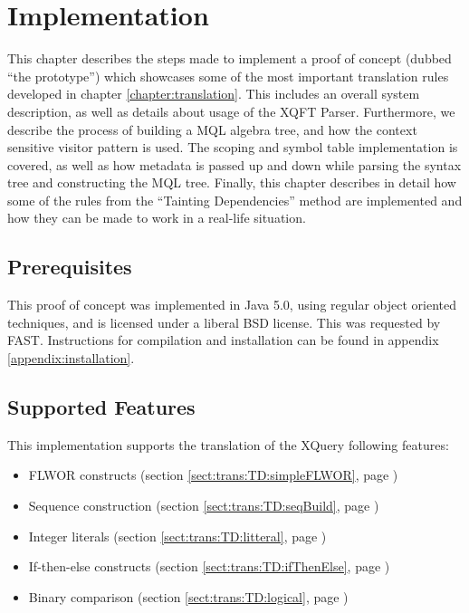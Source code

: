 \chapter{Implementation}
\label{chapter:implementation}
This chapter describes the steps made to implement a proof of concept (dubbed
``the prototype'') which showcases some of the most important translation rules
developed in chapter \ref{chapter:translation}. This includes an overall system
description, as well as details about usage of the XQFT Parser. Furthermore, we
describe the process of building a MQL algebra tree, and how the context
sensitive visitor pattern is used. The scoping and symbol table implementation
is covered, as well as how metadata is passed up and down while parsing the
syntax tree and constructing the MQL tree. Finally, this chapter describes in
detail how some of the rules from the ``Tainting Dependencies'' method are
implemented and how they can be made to work in a real-life situation.

\section{Prerequisites}
This proof of concept was implemented in Java 5.0, using regular object
oriented techniques, and is licensed under a liberal BSD license.
This was requested by FAST. Instructions for compilation and installation can
be found in appendix \ref{appendix:installation}.

\section{Supported Features}
This implementation supports the translation of the XQuery following features:
\begin{itemize}
  \item FLWOR constructs (section \ref{sect:trans:TD:simpleFLWOR}, page
  \pageref{sect:trans:TD:simpleFLWOR})
  \item Sequence construction (section \ref{sect:trans:TD:seqBuild}, page
  \pageref{sect:trans:TD:seqBuild})
  \item Integer literals (section \ref{sect:trans:TD:litteral}, page
  \pageref{sect:trans:TD:litteral})
  \item If-then-else constructs (section \ref{sect:trans:TD:ifThenElse}, page
  \pageref{sect:trans:TD:ifThenElse})
  \item Binary comparison (section \ref{sect:trans:TD:logical}, page
  \pageref{sect:trans:TD:logical})
\end{itemize}

